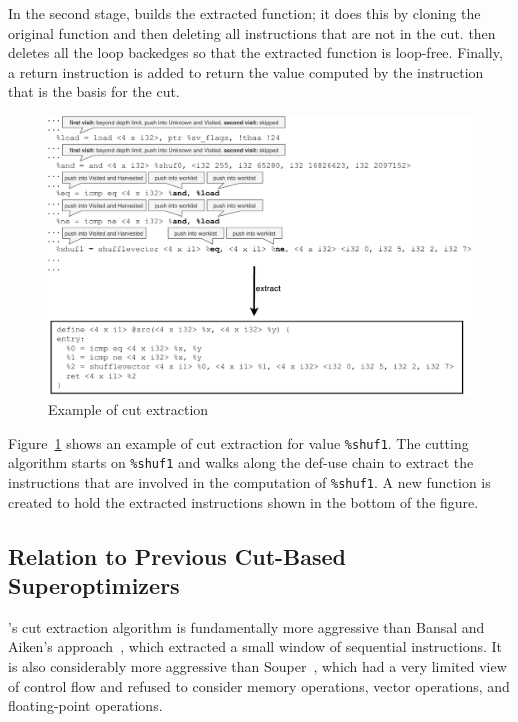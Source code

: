 In the second stage, \minotaur{} builds the extracted function; it does
this by cloning the original function and then deleting all
instructions that are not in the cut.
%
\minotaur{} then deletes all the loop backedges so that the extracted
function is loop-free.
%
Finally, a return instruction is added to return the value computed by
the instruction that is the basis for the cut.

\begin{figure}
  \centering
  \includegraphics[width=0.8\linewidth]{figures/slice.pdf}
  \caption{Example of cut extraction}
  \label{fig:cut}
\end{figure}


Figure~\ref{fig:cut} shows an example of cut extraction
for value \texttt{\%shuf1}.
%
The cutting algorithm starts on \texttt{\%shuf1} and walks along the
def-use chain to extract the instructions that are involved in the
computation of \texttt{\%shuf1}.
%
A new function is created to hold the extracted instructions shown
in the bottom of the figure.



\subsection{Relation to Previous Cut-Based Superoptimizers}

\minotaur's cut extraction algorithm is fundamentally more aggressive
than Bansal and Aiken's approach~\cite{Bansal06}, which extracted a
small window of sequential instructions.
%
It is also considerably more aggressive than Souper~\cite{souper},
which had a very limited view of control flow and refused to consider
memory operations, vector operations, and floating-point operations.